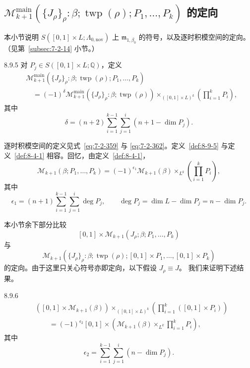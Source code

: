 
\subsection{\texorpdfstring{$\mathcal M_{k+1}^{\mathrm{main}}
(\{J_\rho\}_\rho:\beta;\operatorname{twp}(\rho);P_1,\ldots,P_k)$
的定向}{逐时积模空间的定向}}
\label{subsec:8-9-2}

本小节说明
$S([0,1]\times L;\Lambda_{0,\mathrm{nov}})$ 上
$\mathfrak m_{1,\beta_0}$ 的符号，以及逐时积模空间的定向。
（见第~\ref{subsec:7-2-14} 小节。）

\begin{definition}{8.9.5}\label{def:8-9-5}
对 $P_j\in S([0,1]\times L;\mathbb Q)$，定义
\[
\begin{aligned}
 &\mathcal M_{k+1}^{\mathrm{main}}
 (\{J_\rho\}_\rho:\beta;\operatorname{twp}(\rho);
 P_1,\ldots,P_k)\\
 &\quad={}
 (-1)^\delta
 \mathcal M_{k+1}^{\mathrm{main}}
 (\{J_\rho\}_\rho:\beta;\operatorname{twp}(\rho))
 \mathop{\times}_{([0,1]\times L)^k}
 \left(\prod_{i=1}^{k}P_i\right),
\end{aligned}
\]
其中
\[
 \delta=(n+2)
 \sum_{i=1}^{k-1}\sum_{j=1}^{i}(n+1-\dim P_j).
\]
\end{definition}

逐时积模空间的定义见式~\eqref{eq:7-2-359} 与
\eqref{eq:7-2-362}。定义~\ref{def:8-9-5}
与定义~\ref{def:8-4-1} 相容。回忆，由定义~\ref{def:8-4-1}，
\[
 \mathcal M_{k+1}(\beta;P_1,\ldots,P_k)
 =(-1)^{\epsilon_1}\mathcal M_{k+1}(\beta)
 \mathop{\times}_{L^k}
 \left(\prod_{i=1}^{k}P_i\right),
\]
其中
\[
 \epsilon_1=(n+1)
 \sum_{i=1}^{k-1}\sum_{j=1}^{i}\deg P_j,
 \qquad
 \deg P_j=\dim L-\dim P_j=n-\dim P_j.
\]

本小节余下部分比较
\[
 [0,1]\times
 \mathcal M_{k+1}(J_\rho;\beta;P_1,\ldots,P_k)
\]
与
\[
 \mathcal M_{k+1}
 (\{J_\rho\}_\rho:\beta;\operatorname{twp}(\rho);
 [0,1]\times P_1,\ldots,[0,1]\times P_k)
\]
的定向。由于这里只关心符号亦即定向，以下假设 $J_\rho\equiv J$。
我们来证明下述结果。

\begin{lemma}{8.9.6}\label{lem:8-9-6}
\[
\begin{aligned}
 &\left([0,1]\times\mathcal M_{k+1}(\beta)\right)
 \mathop{\times}_{([0,1]\times L)^k}
 \left(\prod_{i=1}^{k}([0,1]\times P_i)\right)\\
 &\qquad={}
 (-1)^{\epsilon_2}[0,1]\times
 \left(\mathcal M_{k+1}(\beta)
 \mathop{\times}_{L^k}\prod_{i=1}^{k}P_i\right),
\end{aligned}
\]
其中
\[
 \epsilon_2=\sum_{i=1}^{k-1}\sum_{j=1}^{i}(n-\dim P_j).
\]
\end{lemma}

